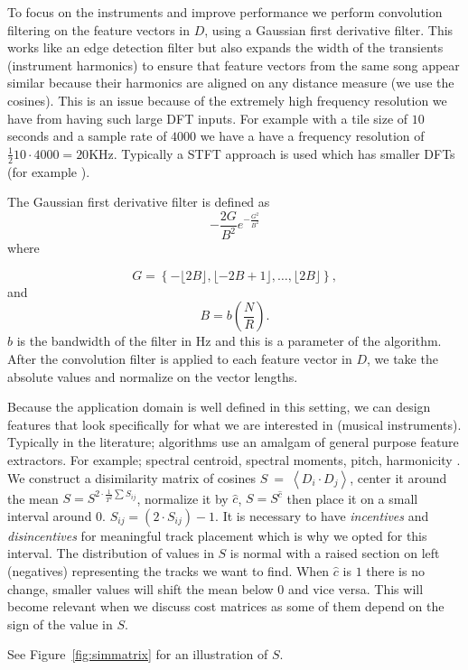 \documentclass[twocolumn]{article}
\begin{document}
To focus on the instruments and improve performance we perform convolution filtering on the feature vectors in $D$, using a Gaussian first derivative filter. This works like an edge detection filter but also expands the width of the transients (instrument harmonics) to ensure that feature vectors from the same song appear similar because their harmonics are aligned on any distance measure (we use the cosines). This is an issue because of the extremely high frequency resolution we have from having such large DFT inputs. For example with a tile size of $10$ seconds and a sample rate of $4000$ we have a have a frequency resolution of $\frac{1}{2}10 \cdot 4000 = 20$KHz. Typically a STFT approach is used which has smaller DFTs (for example \cite{tzanetakis1999multifeature}). 

The Gaussian first derivative filter is defined as 
$$- \frac{2 G}{B^2}  e^{-\frac{G^2}{B^2}} $$ where 

$$G=\left\{-\lfloor 2B\rfloor,\lfloor-2B+1\rfloor,\ldots, \lfloor 2 B \rfloor\right\},$$ and $$B = b \left( \frac{N}{R} \right).$$ $b$ is the bandwidth of the filter in Hz and this is a parameter of the algorithm. After the convolution filter is applied to each feature vector in $D$, we take the absolute values and normalize on the vector lengths.  

Because the application domain is well defined in this setting, we can design features that look specifically for what we are interested in (musical instruments). Typically in the literature; algorithms use an amalgam of general purpose feature extractors. For example; spectral centroid, spectral moments, pitch, harmonicity \cite{tzanetakis1999framework}. We construct a disimilarity matrix of cosines $S ~=~ \left< D_{i} \cdot D_{j} \right>$, center it around the mean $S = S^{2 \cdot \frac{1}{T^2}\sum S_{ij}}$, normalize it by $\hat c$, $S=S^{\hat c}$ then place it on a small interval around $0$. $S_{ij} = \left( 2 \cdot S_{ij} \right)-1$. It is necessary to have \textit{incentives} and \textit{disincentives} for meaningful track placement which is why we opted for this interval. The distribution of values in $S$ is normal with a raised section on left (negatives) representing the tracks we want to find. When $\hat c$ is $1$ there is no change, smaller values will shift the mean below $0$ and vice versa. This will become relevant when we discuss cost matrices as some of them depend on the sign of the value in $S$. 

See Figure~\ref{fig:simmatrix} for an illustration of $S$.
\end{document}
